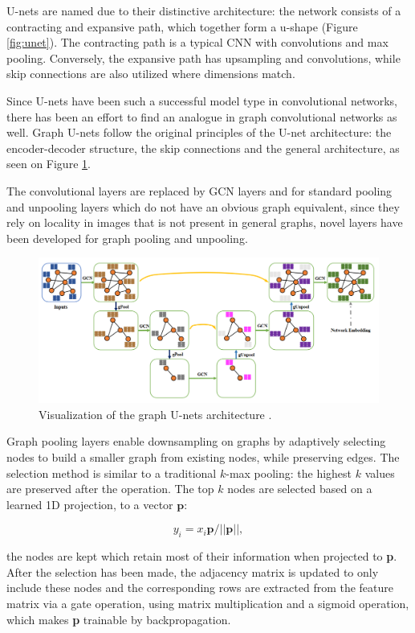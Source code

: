	
	U-nets are named due to their distinctive architecture: the network consists of a contracting and expansive path, which together form a u-shape (Figure \ref{fig:unet}). The contracting path is a typical CNN with convolutions and max pooling. Conversely, the expansive path has upsampling and convolutions, while skip connections are also utilized where dimensions match.
	
	Since U-nets have been such a successful model type in convolutional networks, there has been an effort to find an analogue in graph convolutional networks as well. Graph U-nets \cite{graph-u-net} follow the original principles of the U-net architecture: the encoder-decoder structure, the skip connections and the general architecture, as seen on Figure \ref{fig:gunet}. 
	
	The convolutional layers are replaced by GCN layers and for standard pooling and unpooling layers which do not have an obvious graph equivalent, since they rely on locality in images that is not present in general graphs, novel layers have been developed for graph pooling and unpooling.
	
	\begin{figure}[!h]
		\centering
		\includegraphics[width=\textwidth]{figures/gunet.png}
		\caption{Visualization of the graph U-nets architecture \cite{graph-u-net}.}
		\label{fig:gunet}
	\end{figure}
	
	Graph pooling layers enable downsampling on graphs by adaptively selecting nodes to build a smaller graph from existing nodes, while preserving edges. The selection method is similar to a traditional $k$-max pooling: the highest $k$ values are preserved after the operation. The top $k$ nodes are selected based on a learned 1D projection, to a vector $\textbf{p}$:
	
	
	$$ y_i = x_i\textbf{p}/||\textbf{p}||, $$
	
	the nodes are kept which retain most of their information when projected to \textbf{p}. After the selection has been made, the adjacency matrix is updated to only include these nodes and the corresponding rows are extracted from the feature matrix via a gate operation, using matrix multiplication and a sigmoid operation, which makes \textbf{p} trainable by backpropagation.
	
